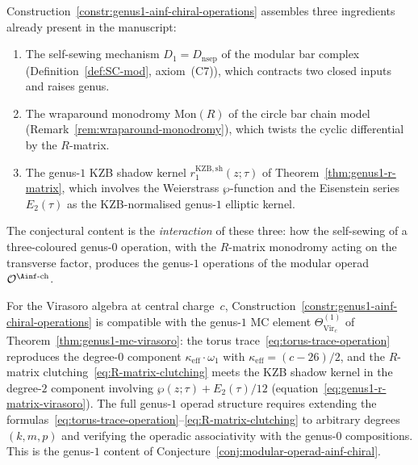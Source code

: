 \begin{remark}
\label{rem:genus1-ainf-context}
Construction~\ref{constr:genus1-ainf-chiral-operations}
assembles three ingredients already present in the
manuscript:
\begin{enumerate}[label=\textup{(\roman*)}]
\item The self-sewing mechanism
 $D_1 = D_{\mathrm{nsep}}$ of the modular bar complex
 (Definition~\ref{def:SC-mod}, axiom~(C7)), which
 contracts two closed inputs and raises genus.
\item The wraparound monodromy $\mathrm{Mon}(R)$ of
 the circle bar chain model
 (Remark~\ref{rem:wraparound-monodromy}), which
 twists the cyclic differential by the $R$-matrix.
\item The genus-$1$ KZB shadow kernel
 \(r^{\mathrm{KZB},\mathrm{sh}}_1(z;\tau)\) of
 Theorem~\ref{thm:genus1-r-matrix}, which involves the
Weierstrass $\wp$-function and the Eisenstein series
$E_2(\tau)$ as the KZB-normalised genus-$1$ elliptic kernel.
\end{enumerate}
The conjectural content is the \emph{interaction} of
these three: how the self-sewing of a three-coloured
genus-$0$ operation, with the $R$-matrix monodromy
acting on the transverse factor, produces the genus-$1$
operations of the modular operad
$\mathcal{O}^{\Ainf\text{-ch}}$.

For the Virasoro algebra at central charge~$c$,
Construction~\ref{constr:genus1-ainf-chiral-operations}
is compatible with the genus-$1$ MC element
$\Theta^{(1)}_{\mathrm{Vir}_c}$ of
Theorem~\ref{thm:genus1-mc-virasoro}: the torus
trace~\eqref{eq:torus-trace-operation} reproduces the
degree-$0$ component $\kappa_{\mathrm{eff}} \cdot \omega_1$
with $\kappa_{\mathrm{eff}} = (c-26)/2$, and the
$R$-matrix clutching~\eqref{eq:R-matrix-clutching}
meets the KZB shadow kernel in the degree-$2$ component involving
$\wp(z;\tau) + E_2(\tau)/12$
(equation~\eqref{eq:genus1-r-matrix-virasoro}).
The full genus-$1$ operad structure requires
extending the formulas~\eqref{eq:torus-trace-operation}--\eqref{eq:R-matrix-clutching}
to arbitrary degrees $(k,m,p)$ and verifying the
operadic associativity with the genus-$0$ compositions.
This is the genus-$1$ content of
Conjecture~\ref{conj:modular-operad-ainf-chiral}.
\end{remark}

